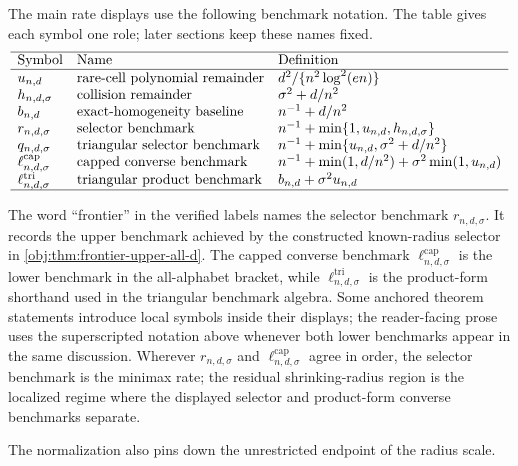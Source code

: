 \documentclass[11pt]{article}
\begin{document}
The main rate displays use the following benchmark notation. The table gives each symbol one role; later sections keep these names fixed.
\[
\begin{array}{lll}
\hline
\text{Symbol} & \text{Name} & \text{Definition}\\
\hline
u_{n,d} & \text{rare-cell polynomial remainder} & d^2/\{n^2\log^2(en)\}\\
h_{n,d,\sigma} & \text{collision remainder} & \sigma^2+d/n^2\\
b_{n,d} & \text{exact-homogeneity baseline} & n^{-1}+d/n^2\\
r_{n,d,\sigma} & \text{selector benchmark} & n^{-1}+\min\{1,u_{n,d},h_{n,d,\sigma}\}\\
q_{n,d,\sigma} & \text{triangular selector benchmark} & n^{-1}+\min\{u_{n,d},\sigma^2+d/n^2\}\\
\ell^{\mathrm{cap}}_{n,d,\sigma} & \text{capped converse benchmark} & n^{-1}+\min(1,d/n^2)+\sigma^2\min(1,u_{n,d})\\
\ell^{\mathrm{tri}}_{n,d,\sigma} & \text{triangular product benchmark} & b_{n,d}+\sigma^2u_{n,d}\\
\hline
\end{array}
\]

The word ``frontier'' in the verified labels names the selector benchmark \(r_{n,d,\sigma}\). It records the upper benchmark achieved by the constructed known-radius selector in \cref{obj:thm:frontier-upper-all-d}. The capped converse benchmark \(\ell^{\mathrm{cap}}_{n,d,\sigma}\) is the lower benchmark in the all-alphabet bracket, while \(\ell^{\mathrm{tri}}_{n,d,\sigma}\) is the product-form shorthand used in the triangular benchmark algebra. Some anchored theorem statements introduce local symbols inside their displays; the reader-facing prose uses the superscripted notation above whenever both lower benchmarks appear in the same discussion. Wherever \(r_{n,d,\sigma}\) and \(\ell^{\mathrm{cap}}_{n,d,\sigma}\) agree in order, the selector benchmark is the minimax rate; the residual shrinking-radius region is the localized regime where the displayed selector and product-form converse benchmarks separate.

The normalization also pins down the unrestricted endpoint of the radius scale.
\end{document}
